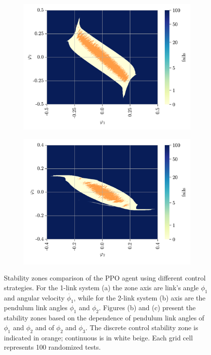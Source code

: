 \begin{figure}[h!]
	\begin{subfigure}[t]{0.48\textwidth}
		\centering
		\includegraphics[width=\textwidth]{Figures/TP_continuous_vs_discrete_phi1phi2.png}
		\label{fig: tp - continuous vs discrete, phi1 phi2}
		\caption{}
	\end{subfigure}
	\hfill
	\begin{subfigure}[t]{0.48\textwidth}
		\centering
		\includegraphics[width=\textwidth]{Figures/TP_continuous_vs_discrete_phi2phi3.png}
		\label{fig: tp - continuous vs discrete, phi2 phi3}
		\caption{}
	\end{subfigure}
	
	\caption{Stability zones comparison of the PPO agent using different control strategies. For the 1-link system (a) the zone axis are link's angle $\phi_1$ and angular velocity $\dot{\phi_1}$, while for the 2-link system (b) axis are the pendulum link angles $\phi_1$ and $\phi_2$. Figures (b) and (c) present the stability zones based on the dependence of pendulum link angles of $\phi_1$ and $\phi_2$ and of $\phi_2$ and $\phi_3$. The discrete control stability zone is indicated in orange; continuous is in white beige. Each grid cell represents 100 randomized tests.}
	\label{fig: continuous vs discrete}
\end{figure}

